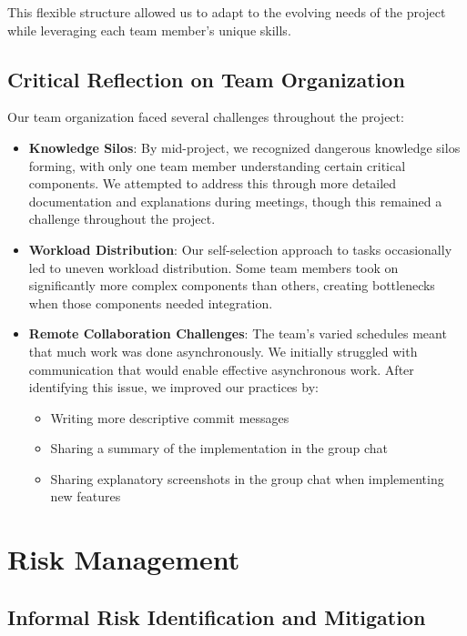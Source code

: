 This flexible structure allowed us to adapt to the evolving needs of the project while leveraging each team member's unique skills.

\subsection{Critical Reflection on Team Organization}

Our team organization faced several challenges throughout the project:

\begin{itemize}
    \item \textbf{Knowledge Silos}: By mid-project, we recognized dangerous knowledge silos forming, with only one team member understanding certain critical components. We attempted to address this through more detailed documentation and explanations during meetings, though this remained a challenge throughout the project.
    
    \item \textbf{Workload Distribution}: Our self-selection approach to tasks occasionally led to uneven workload distribution. Some team members took on significantly more complex components than others, creating bottlenecks when those components needed integration.
    
    \item \textbf{Remote Collaboration Challenges}: The team's varied schedules meant that much work was done asynchronously. We initially struggled with communication that would enable effective asynchronous work. After identifying this issue, we improved our practices by:
    \begin{itemize}
        \item Writing more descriptive commit messages
        \item Sharing a summary of the implementation in the group chat
        \item Sharing explanatory screenshots in the group chat when implementing new features
    \end{itemize}
\end{itemize}

\section{Risk Management}

\subsection{Informal Risk Identification and Mitigation}

